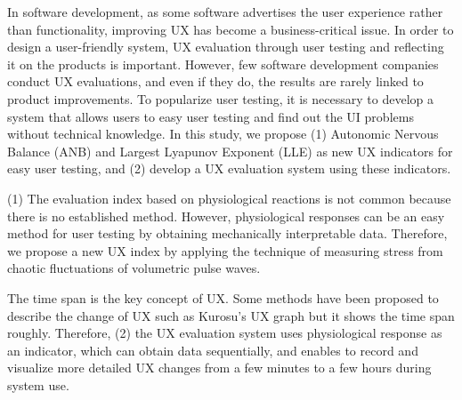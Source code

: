 \begin{eabstract}

In software development, as some software advertises the user experience rather than functionality, improving UX has become a business-critical issue. In order to design a user-friendly system, UX evaluation through user testing and reflecting it on the products is important. However, few software development companies conduct UX evaluations, and even if they do, the results are rarely linked to product improvements. To popularize user testing, it is necessary to develop a system that allows users to easy user testing and find out the UI problems without technical knowledge. In this study, we propose (1) Autonomic Nervous Balance (ANB) and Largest Lyapunov Exponent (LLE) as new UX indicators for easy user testing, and (2) develop a UX evaluation system using these indicators.

(1) The evaluation index based on physiological reactions is not common because there is no established method. However, physiological responses can be an easy method for user testing by obtaining mechanically interpretable data. Therefore, we propose a new UX index by applying the technique of measuring stress from chaotic fluctuations of volumetric pulse waves.

The time span is the key concept of UX. Some methods have been proposed to describe the change of UX such as Kurosu's UX graph but it shows the time span roughly. Therefore, (2) the UX evaluation system uses physiological response as an indicator, which can obtain data sequentially, and enables to record and visualize more detailed UX changes from a few minutes to a few hours during system use.

\end{eabstract}
